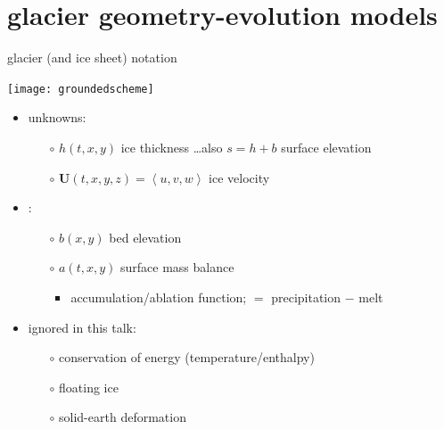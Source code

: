 \documentclass[xcolor={dvipsnames}]{beamer}
\newcommand\bU{\mathbf{U}}
\begin{document}
\section{glacier geometry-evolution models}

\begin{frame}{glacier (and ice sheet) notation}

\begin{center}
\texttt{[image: groundedscheme]}
\end{center}

\begin{itemize}
\item unknowns:
  \begin{itemize}
  \item[$\circ$]  $h(t,x,y)$ ice thickness \hfill \dots also $s=h+b$ surface elevation
  \item[$\circ$]  $\bU(t,x,y,z) = \left<u,v,w\right>$ ice velocity
  \end{itemize}
\item {}:
  \begin{itemize}
  \item[$\circ$]  $b(x,y)$ bed elevation 
  \item[$\circ$]  $a(t,x,y)$ surface mass balance  
    \begin{itemize}
    \item accumulation/ablation function; $=$ precipitation $-$ melt
    \end{itemize}
  \end{itemize}
\item ignored in this talk:
  \begin{itemize}
  \item[$\circ$]  conservation of energy (temperature/enthalpy)
  \item[$\circ$]  floating ice
  \item[$\circ$]  solid-earth deformation
  \end{itemize}
\end{itemize}
\end{frame}
\end{document}
